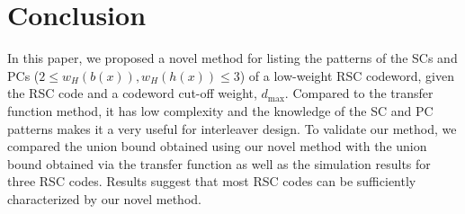 \section{Conclusion}
\label{sec6}
In this paper, we proposed a novel method for  listing the patterns of the SCs and PCs ($2 \leq w_H(b(x)),w_H(h(x)) \leq 3$) of a low-weight RSC codeword, given the RSC code and a codeword cut-off weight, $d_{\text{max}}$.
Compared to the transfer function method, it has low complexity and the knowledge of the SC and PC patterns makes it a very useful for interleaver design. To validate our method, we compared the union bound obtained using our novel method with the union bound obtained via the transfer function as well as the simulation results for three RSC codes. Results suggest that most RSC codes can be sufficiently characterized by our novel method.

